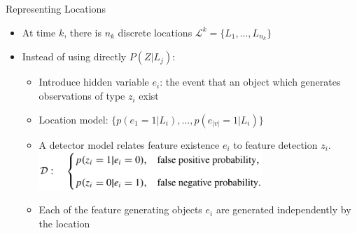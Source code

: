 \begin{frame}{Representing Locations}
    \begin{itemize}
        \item At time $k$, there is $n_k$ discrete locations $\mathcal{L}^k=\{L_1,...,L_{n_k}\}$
        \item Instead of using directly $P(Z|L_j)$:
            \begin{itemize}
                \item Introduce hidden variable $e_i$: the event that an object which generates observations of type $z_i$ exist
                \item Location model: $\{p(e_1=1|L_i),...,p(e_{|v|}=1|L_i)\}$
                \item A detector model relates feature existence $e_i$ to feature detection $z_i$.
                    \includegraphics[width=0.7\textwidth]{./media/detector.png}
                \item Each of the feature generating objects $e_i$ are generated independently by the location
            \end{itemize}
    \end{itemize}
\end{frame}

